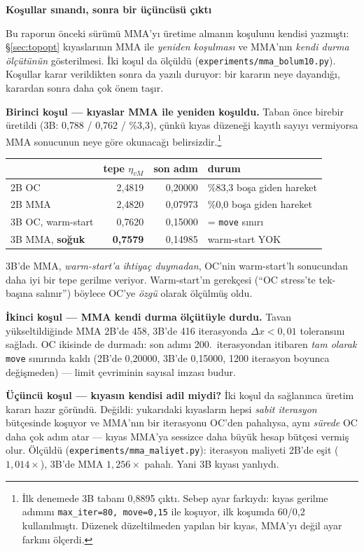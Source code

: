 \documentclass[11pt,a4paper]{article}
\newcommand{\kkkenar}{lacivert}
\newcommand{\kkzemin}{kod}
\newenvironment{renkkutu}[3]{%
  \renewcommand{\kkkenar}{#1}\renewcommand{\kkzemin}{#2}%
  \par\medskip\noindent
  \begin{lrbox}{\kutugovde}%
  \begin{minipage}{\dimexpr\linewidth-2\fboxsep-2\fboxrule\relax}\footnotesize
  \textcolor{#1}{\textbf{#3}}\par\vspace{3pt}%
}{%
  \end{minipage}%
  \end{lrbox}%
  \noindent\fcolorbox{\kkkenar}{\kkzemin}{\usebox{\kutugovde}}%
  \par\medskip
}
\newenvironment{dikkat}[1]{\begin{renkkutu}{orta}{ortabg}{#1}}{\end{renkkutu}}
\begin{document}
\begin{dikkat}{Koşullar sınandı, sonra bir üçüncüsü çıktı}
Bu raporun önceki sürümü MMA'yı üretime almanın koşulunu kendisi yazmıştı:
\S\ref{sec:topopt} kıyaslarının MMA ile \emph{yeniden koşulması} ve MMA'nın
\emph{kendi durma ölçütünün} gösterilmesi. İki koşul da ölçüldü
(\texttt{experiments/mma\_bolum10.py}). Koşullar karar verildikten sonra da
yazılı duruyor: bir kararın neye dayandığı, karardan sonra daha çok önem
taşır.

\textbf{Birinci koşul --- kıyaslar MMA ile yeniden koşuldu.} Taban önce
birebir üretildi (3B: 0{,}788 / 0{,}762 / \%3{,}3), çünkü kıyas düzeneği
kayıtlı sayıyı vermiyorsa MMA sonucunun neye göre okunacağı belirsizdir.\footnote%
{İlk denemede 3B tabanı 0{,}8895 çıktı. Sebep ayar farkıydı: kıyas gerilme
adımını \texttt{max\_iter=80, move=0{,}15} ile koşuyor, ilk koşumda 60/0{,}2
kullanılmıştı. Düzenek düzeltilmeden yapılan bir kıyas, MMA'yı değil ayar
farkını ölçerdi.}

\begin{center}\footnotesize
\begin{tabular}{@{}lrrl@{}}
\toprule
 & tepe $\eta_{vM}$ & son adım & durum \\
\midrule
2B \quad OC              & 2{,}4819 & 0{,}20000 & \%83{,}3 boşa giden hareket \\
2B \quad MMA             & 2{,}4820 & 0{,}07973 & \%0{,}0 boşa giden hareket \\
3B \quad OC, warm-start  & 0{,}7620 & 0{,}15000 & = \texttt{move} sınırı \\
3B \quad MMA, \textbf{soğuk} & \textbf{0{,}7579} & 0{,}14985 & warm-start YOK \\
\bottomrule
\end{tabular}
\end{center}

\noindent 3B'de MMA, \emph{warm-start'a ihtiyaç duymadan}, OC'nin
warm-start'lı sonucundan daha iyi bir tepe gerilme veriyor. Warm-start'ın
gerekçesi (``OC stress'te tek-başına salınır'') böylece OC'ye \emph{özgü}
olarak ölçülmüş oldu.

\textbf{İkinci koşul --- MMA kendi durma ölçütüyle durdu.} Tavan
yükseltildiğinde MMA 2B'de 458, 3B'de 416 iterasyonda $\Delta x < 0{,}01$
toleransını sağladı. OC ikisinde de durmadı: son adımı 200.\ iterasyondan
itibaren \emph{tam olarak} \texttt{move} sınırında kaldı (2B'de 0{,}20000,
3B'de 0{,}15000, 1200 iterasyon boyunca değişmeden) --- limit çevriminin
sayısal imzası budur.

\textbf{Üçüncü koşul --- kıyasın kendisi adil miydi?} İki koşul da
sağlanınca üretim kararı hazır göründü. Değildi: yukarıdaki kıyasların hepsi
\emph{sabit iterasyon} bütçesinde koşuyor ve MMA'nın bir iterasyonu OC'den
pahalıysa, aynı \emph{sürede} OC daha çok adım atar --- kıyas MMA'ya
sessizce daha büyük hesap bütçesi vermiş olur. Ölçüldü
(\texttt{experiments/mma\_maliyet.py}): iterasyon maliyeti 2B'de eşit
($1{,}014\times$), 3B'de MMA $1{,}256\times$ pahalı. Yani
3B kıyası yanlıydı.


\end{dikkat}
\end{document}
